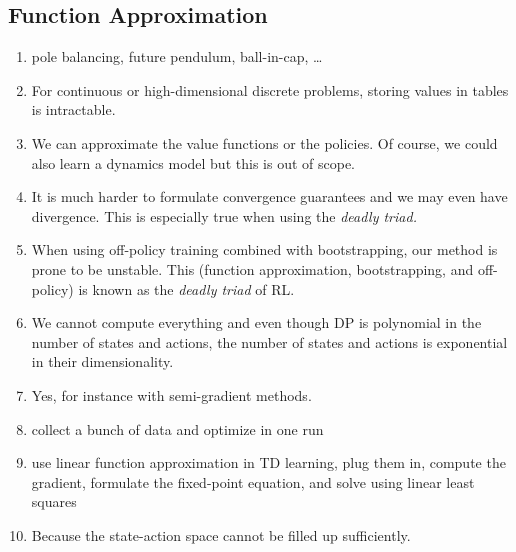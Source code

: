 		\subsection{Function Approximation}
			\begin{enumerate}
				\item pole balancing, future pendulum, ball-in-cap, \dots
				\item For continuous or high-dimensional discrete problems, storing values in tables is intractable.
				\item We can approximate the value functions or the policies. Of course, we could also learn a dynamics model but this is out of scope.
				\item It is much harder to formulate convergence guarantees and we may even have divergence. This is especially true when using the \emph{deadly triad.}
				\item When using off-policy training combined with bootstrapping, our method is prone to be unstable. This (function approximation, bootstrapping, and off-policy) is known as the \emph{deadly triad} of \ac{RL}.
				\item We cannot compute everything and even though \ac{DP} is polynomial in the number of states and actions, the number of states and actions is exponential in their dimensionality.
				\item Yes, for instance with semi-gradient methods.
				\item collect a bunch of data and optimize in one run
				\item use linear function approximation in \ac{TD} learning, plug them in, compute the gradient, formulate the fixed-point equation, and solve using linear least squares
				\item Because the state-action space cannot be filled up sufficiently.
			\end{enumerate}

